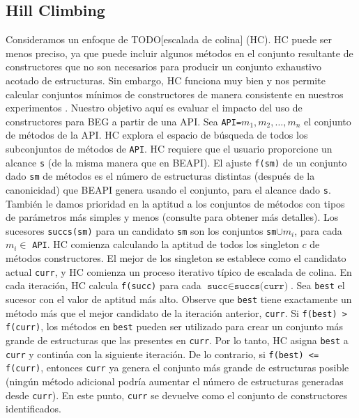 \subsection{Hill Climbing}
Consideramos un enfoque de TODO[escalada de colina] (HC). HC puede ser menos preciso, ya que puede incluir algunos métodos en el conjunto resultante de constructores que no son necesarios para producir un conjunto exhaustivo acotado de estructuras. Sin embargo, HC funciona muy bien y nos permite calcular conjuntos mínimos de constructores de manera consistente en nuestros experimentos . Nuestro objetivo aquí es evaluar el impacto del uso de constructores para BEG a partir de una API.
Sea \texttt{API=}$m_1,m_2,\ldots,m_n$ el conjunto de métodos de la API. HC explora el espacio de búsqueda de todos los subconjuntos de métodos de \texttt{API}. HC requiere que el usuario proporcione un alcance \texttt{s} (de la misma manera que en \textsf{BEAPI}). El ajuste \texttt{f(sm)} de un conjunto dado \texttt{sm} de métodos es el número de estructuras distintas (después de la canonicidad) que \textsf{BEAPI} genera usando el conjunto, para el alcance dado \texttt{s}. También le damos prioridad en la aptitud a los conjuntos de métodos con tipos de parámetros más simples y menos (consulte \cite{Ponzio19} para obtener más detalles). Los sucesores \texttt{succs(sm)} para un candidato \texttt{sm} son los conjuntos \texttt{sm}$\cup {m_i}$, para cada $m_i \in $ \texttt{API}. HC comienza calculando la aptitud de todos los singleton ${c}$ de métodos constructores. El mejor de los singleton se establece como el candidato actual \texttt{curr}, y HC comienza un proceso iterativo típico de escalada de colina. En cada iteración, HC calcula \texttt{f(succ)} para cada $\texttt{succ} \in \texttt{succs(curr)}$. Sea \texttt{best} el sucesor con el valor de aptitud más alto. Observe que \texttt{best} tiene exactamente un método más que el mejor candidato de la iteración anterior, \texttt{curr}. Si \texttt{f(best) > f(curr)}, los métodos en \texttt{best} pueden ser utilizado para crear un conjunto más grande de estructuras que las presentes en \texttt{curr}. Por lo tanto, HC asigna \texttt{best} a \texttt{curr} y continúa con la siguiente iteración. De lo contrario, si \texttt{f(best) <= f(curr)}, entonces \texttt{curr} ya genera el conjunto más grande de estructuras posible (ningún método adicional podría aumentar el número de estructuras generadas desde \texttt{curr}). En este punto, \texttt{curr} se devuelve como el conjunto de constructores identificados.

